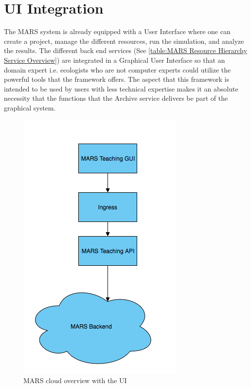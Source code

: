 \section{UI Integration}
The MARS system is already equipped with a User Interface where one can create a project, manage the different resources, run the simulation, and
analyze the results. The different back end services (See \ref{table:MARS Resource Hierarchy Service Overview}) are integrated in a Graphical
User Interface so that an domain expert i.e. ecologists who are not computer experts could utilize the powerful tools that the framework offers.
The aspect that this framework is intended to be used by users with less technical expertise makes it an absolute necessity that
the functions that the Archive service delivers be part of the graphical system.

\begin{figure}[H]
    \centering \includegraphics[scale=0.6]{grafiken/marsIngress.png}
    \caption{MARS cloud overview with the UI}
    \label{fig:marsCloudUI}
\end{figure}

